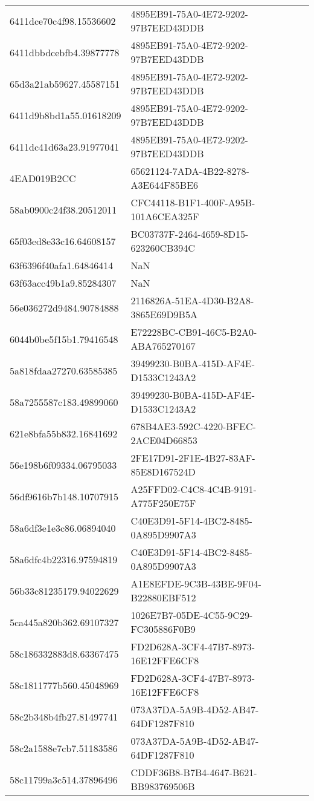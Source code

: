 \begin{tabular}{ll}
6411dce70c4f98.15536602 & 4895EB91-75A0-4E72-9202-97B7EED43DDB \\
6411dbbdcebfb4.39877778 & 4895EB91-75A0-4E72-9202-97B7EED43DDB \\
65d3a21ab59627.45587151 & 4895EB91-75A0-4E72-9202-97B7EED43DDB \\
6411d9b8bd1a55.01618209 & 4895EB91-75A0-4E72-9202-97B7EED43DDB \\
6411dc41d63a23.91977041 & 4895EB91-75A0-4E72-9202-97B7EED43DDB \\
4EAD019B2CC & 65621124-7ADA-4B22-8278-A3E644F85BE6 \\
58ab0900c24f38.20512011 & CFC44118-B1F1-400F-A95B-101A6CEA325F \\
65f03ed8e33c16.64608157 & BC03737F-2464-4659-8D15-623260CB394C \\
63f6396f40afa1.64846414 & NaN \\
63f63acc49b1a9.85284307 & NaN \\
56e036272d9484.90784888 & 2116826A-51EA-4D30-B2A8-3865E69D9B5A \\
6044b0be5f15b1.79416548 & E72228BC-CB91-46C5-B2A0-ABA765270167 \\
5a818fdaa27270.63585385 & 39499230-B0BA-415D-AF4E-D1533C1243A2 \\
58a7255587c183.49899060 & 39499230-B0BA-415D-AF4E-D1533C1243A2 \\
621e8bfa55b832.16841692 & 678B4AE3-592C-4220-BFEC-2ACE04D66853 \\
56e198b6f09334.06795033 & 2FE17D91-2F1E-4B27-83AF-85E8D167524D \\
56df9616b7b148.10707915 & A25FFD02-C4C8-4C4B-9191-A775F250E75F \\
58a6df3e1e3c86.06894040 & C40E3D91-5F14-4BC2-8485-0A895D9907A3 \\
58a6dfc4b22316.97594819 & C40E3D91-5F14-4BC2-8485-0A895D9907A3 \\
56b33c81235179.94022629 & A1E8EFDE-9C3B-43BE-9F04-B22880EBF512 \\
5ca445a820b362.69107327 & 1026E7B7-05DE-4C55-9C29-FC305886F0B9 \\
58c186332883d8.63367475 & FD2D628A-3CF4-47B7-8973-16E12FFE6CF8 \\
58c1811777b560.45048969 & FD2D628A-3CF4-47B7-8973-16E12FFE6CF8 \\
58c2b348b4fb27.81497741 & 073A37DA-5A9B-4D52-AB47-64DF1287F810 \\
58c2a1588e7cb7.51183586 & 073A37DA-5A9B-4D52-AB47-64DF1287F810 \\
58c11799a3c514.37896496 & CDDF36B8-B7B4-4647-B621-BB983769506B \\

\end{tabular}
